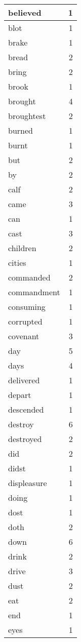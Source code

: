 \begin{center}
\begin{longtable}{l|r}
believed & 1 \\ \hline
blot & 1 \\ \hline
brake & 1 \\ \hline
bread & 2 \\ \hline
bring & 2 \\ \hline
brook & 1 \\ \hline
brought & 4 \\ \hline
broughtest & 2 \\ \hline
burned & 1 \\ \hline
burnt & 1 \\ \hline
but & 2 \\ \hline
by & 2 \\ \hline
calf & 2 \\ \hline
came & 3 \\ \hline
can & 1 \\ \hline
cast & 3 \\ \hline
children & 2 \\ \hline
cities & 1 \\ \hline
commanded & 2 \\ \hline
commandment & 1 \\ \hline
consuming & 1 \\ \hline
corrupted & 1 \\ \hline
covenant & 3 \\ \hline
day & 5 \\ \hline
days & 4 \\ \hline
delivered & 1 \\ \hline
depart & 1 \\ \hline
descended & 1 \\ \hline
destroy & 6 \\ \hline
destroyed & 2 \\ \hline
did & 2 \\ \hline
didst & 1 \\ \hline
displeasure & 1 \\ \hline
doing & 1 \\ \hline
dost & 1 \\ \hline
doth & 2 \\ \hline
down & 6 \\ \hline
drink & 2 \\ \hline
drive & 3 \\ \hline
dust & 2 \\ \hline
eat & 2 \\ \hline
end & 1 \\ \hline
eyes & 1 \\ \hline

\end{longtable}
\end{center}
